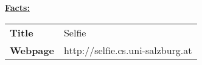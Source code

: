\textcolor{\workinggroupboxtextcolor}{
	\textbf{\underline{Facts:}}
	\newline
	\newline
	\begin{tabular}{l p{}}
		\textbf{Title} & Selfie \\
		\textbf{Webpage} & http://selfie.cs.uni-salzburg.at
	\end{tabular}
}